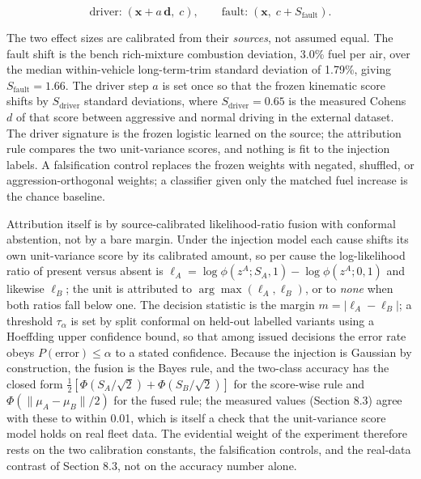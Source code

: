 \begin{equation} \text{driver:}\;(\mathbf{x}+a\,\mathbf{d},\;c), \qquad \text{fault:}\;(\mathbf{x},\;c+S_{\text{fault}}). \end{equation}

The two effect sizes are calibrated from their \emph{sources}, not
assumed equal. The fault shift is the bench rich-mixture combustion
deviation, 3.0\% fuel per air, over the median within-vehicle
long-term-trim standard deviation of 1.79\%, giving
\(S_{\text{fault}} = 1.66\). The driver step \(a\) is set once so that
the frozen kinematic score shifts by \(S_{\text{driver}}\) standard
deviations, where \(S_{\text{driver}} = 0.65\) is the measured
Cohen\textquotesingle s \(d\) of that score between aggressive and
normal driving in the external dataset. The driver signature is the
frozen logistic learned on the source; the attribution rule compares the
two unit-variance scores, and nothing is fit to the injection labels. A
falsification control replaces the frozen weights with negated,
shuffled, or aggression-orthogonal weights; a classifier given only the
matched fuel increase is the chance baseline.

Attribution itself is by source-calibrated likelihood-ratio fusion with
conformal abstention, not by a bare margin. Under the injection model
each cause shifts its own unit-variance score by its calibrated amount,
so per cause the log-likelihood ratio of present versus absent is
\(\ell_A = \log \phi(z^A; S_A,1) - \log \phi(z^A; 0,1)\) and likewise
\(\ell_B\); the unit is attributed to \(\arg\max(\ell_A,\ell_B)\), or to
\emph{none} when both ratios fall below one. The decision statistic is
the margin \(m = |\ell_A - \ell_B|\); a threshold \(\tau_\alpha\) is set
by split conformal on held-out labelled variants using a Hoeffding upper
confidence bound, so that among issued decisions the error rate obeys
\(P(\text{error}) \le \alpha\) to a stated confidence. Because the
injection is Gaussian by construction, the fusion is the Bayes rule, and
the two-class accuracy has the closed form
\(\tfrac12[\Phi(S_A/\sqrt2)+\Phi(S_B/\sqrt2)]\) for the score-wise rule
and \(\Phi(\lVert\mu_A-\mu_B\rVert/2)\) for the fused rule; the measured
values (Section 8.3) agree with these to within 0.01, which is itself a
check that the unit-variance score model holds on real fleet data. The
evidential weight of the experiment therefore rests on the two
calibration constants, the falsification controls, and the real-data
contrast of Section 8.3, not on the accuracy number alone.

